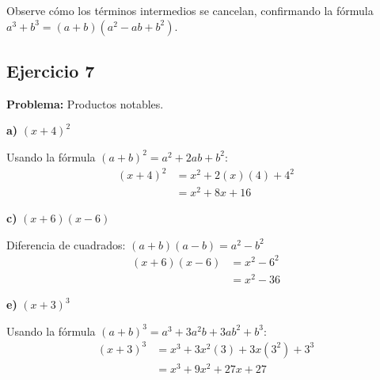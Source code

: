 Observe cómo los términos intermedios se cancelan, confirmando la fórmula $a^3 + b^3 = (a + b)(a^2 - ab + b^2)$.

\subsection*{Ejercicio 7}

\textbf{Problema:} Productos notables.

\textbf{a)} $(x + 4)^2$

Usando la fórmula $(a + b)^2 = a^2 + 2ab + b^2$:
\begin{align}
(x + 4)^2 &= x^2 + 2(x)(4) + 4^2\\
&= x^2 + 8x + 16
\end{align}

\textbf{c)} $(x + 6)(x - 6)$

Diferencia de cuadrados: $(a + b)(a - b) = a^2 - b^2$
\begin{align}
(x + 6)(x - 6) &= x^2 - 6^2\\
&= x^2 - 36
\end{align}

\textbf{e)} $(x + 3)^3$

Usando la fórmula $(a + b)^3 = a^3 + 3a^2b + 3ab^2 + b^3$:
\begin{align}
(x + 3)^3 &= x^3 + 3x^2(3) + 3x(3^2) + 3^3\\
&= x^3 + 9x^2 + 27x + 27
\end{align}

